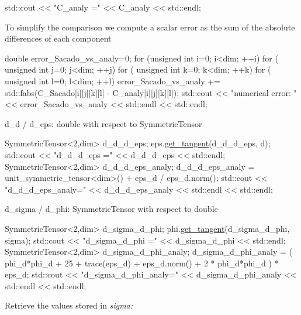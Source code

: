 \begin{DoxyCode}
std::cout << \textcolor{stringliteral}{"C\_analy ="} << C\_analy << std::endl;
\end{DoxyCode}
 To simplify the comparison we compute a scalar error as the sum of the absolute differences of each component 
\begin{DoxyCode}
\textcolor{keywordtype}{double} error\_Sacado\_vs\_analy=0;
\textcolor{keywordflow}{for} (\textcolor{keywordtype}{unsigned} \textcolor{keywordtype}{int} i=0; i<dim; ++i)
     \textcolor{keywordflow}{for} ( \textcolor{keywordtype}{unsigned} \textcolor{keywordtype}{int} j=0; j<dim; ++j)
         \textcolor{keywordflow}{for} ( \textcolor{keywordtype}{unsigned} \textcolor{keywordtype}{int} k=0; k<dim; ++k)
             \textcolor{keywordflow}{for} ( \textcolor{keywordtype}{unsigned} \textcolor{keywordtype}{int} l=0; l<dim; ++l)
                 error\_Sacado\_vs\_analy += std::fabs(C\_Sacado[i][j][k][l] - C\_analy[i][j][k][l]);
std::cout << \textcolor{stringliteral}{"numerical error: "} << error\_Sacado\_vs\_analy << std::endl << std::endl;
\end{DoxyCode}
 d\+\_\+d / d\+\_\+eps\+: double with respect to Symmetric\+Tensor 
\begin{DoxyCode}
SymmetricTensor<2,dim> d\_d\_d\_eps;
eps.\hyperlink{classSacado__Wrapper_1_1SymTensor_ab97427c3b5cab279e58607cf431ab262}{get\_tangent}(d\_d\_d\_eps, d);
std::cout << \textcolor{stringliteral}{"d\_d\_d\_eps      ="} << d\_d\_d\_eps << std::endl;
SymmetricTensor<2,dim> d\_d\_d\_eps\_analy;
d\_d\_d\_eps\_analy = unit\_symmetric\_tensor<dim>() + eps\_d / eps\_d.norm();
std::cout << \textcolor{stringliteral}{"d\_d\_d\_eps\_analy="} << d\_d\_d\_eps\_analy << std::endl << std::endl;
\end{DoxyCode}
 d\+\_\+sigma / d\+\_\+phi\+: Symmetric\+Tensor with respect to double 
\begin{DoxyCode}
SymmetricTensor<2,dim> d\_sigma\_d\_phi;
phi.\hyperlink{classSacado__Wrapper_1_1SW__double_a2e6eca4457eb22b06172bb5749038f1e}{get\_tangent}(d\_sigma\_d\_phi, sigma);
std::cout << \textcolor{stringliteral}{"d\_sigma\_d\_phi      ="} << d\_sigma\_d\_phi << std::endl;
SymmetricTensor<2,dim> d\_sigma\_d\_phi\_analy;
d\_sigma\_d\_phi\_analy = ( phi\_d*phi\_d + 25 + trace(eps\_d) + eps\_d.norm() + 2 * phi\_d*phi\_d ) * eps\_d;
std::cout << \textcolor{stringliteral}{"d\_sigma\_d\_phi\_analy="} << d\_sigma\_d\_phi\_analy << std::endl << std::endl;
\end{DoxyCode}
 Retrieve the values stored in {\itshape sigma\+:} 
